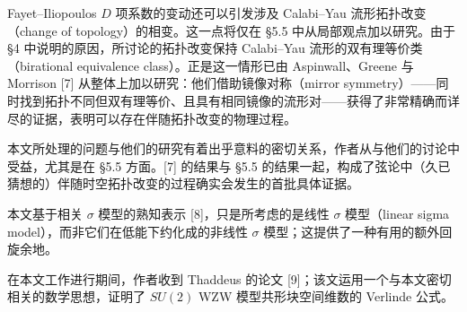 Fayet--Iliopoulos $D$ 项系数的变动还可以引发涉及 Calabi--Yau 流形拓扑改变（change of topology）的相变。这一点将仅在 §5.5 中从局部观点加以研究。由于 §4 中说明的原因，所讨论的拓扑改变保持 Calabi--Yau 流形的双有理等价类（birational equivalence class）。正是这一情形已由%
\label{op:4}
Aspinwall、Greene 与 Morrison [7] 从整体上加以研究：他们借助镜像对称（mirror symmetry）——同时找到拓扑不同但双有理等价、且具有相同镜像的流形对——获得了非常精确而详尽的证据，表明可以存在伴随拓扑改变的物理过程。


本文所处理的问题与他们的研究有着出乎意料的密切关系，作者从与他们的讨论中受益，尤其是在 §5.5 方面。[7] 的结果与 §5.5 的结果一起，构成了弦论中（久已猜想的）伴随时空拓扑改变的过程确实会发生的首批具体证据。

本文基于相关 $\sigma$ 模型的熟知表示 [8]，只是所考虑的是线性 $\sigma$ 模型（linear sigma model），而非它们在低能下约化成的非线性 $\sigma$ 模型；这提供了一种有用的额外回旋余地。


在本文工作进行期间，作者收到 Thaddeus 的论文 [9]；该文运用一个与本文密切相关的数学思想，证明了 $SU(2)$ WZW 模型共形块空间维数的 Verlinde 公式。
